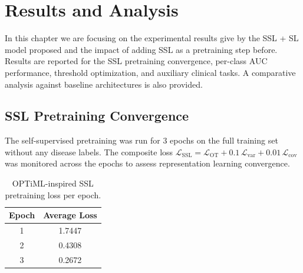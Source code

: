 
\chapter{Results and Analysis}
\label{chap:results}

In this chapter we are focusing on the experimental results give by the SSL + SL model proposed and the impact of adding SSL as a pretraining step before. Results are reported for the SSL pretraining convergence, per-class AUC performance, threshold optimization, and auxiliary clinical tasks. A comparative analysis against baseline architectures is also provided.

\section{SSL Pretraining Convergence}
\label{sec:ssl_results}

The self-supervised pretraining was run for 3 epochs on the full training set without any disease labels. The composite loss $\mathcal{L}_{\text{SSL}} = \mathcal{L}_{\text{OT}} + 0.1\,\mathcal{L}_{\text{var}} + 0.01\,\mathcal{L}_{\text{cov}}$ was monitored across the epochs to assess representation learning convergence.

\begin{table}[ht]
\centering
\caption{OPTiML-inspired SSL pretraining loss per epoch.}
\label{tab:ssl_loss}
\renewcommand{\arraystretch}{1.3}
\begin{tabular}{cc}
\toprule
\textbf{Epoch} & \textbf{Average Loss} \\
\midrule
1  & 1.7447 \\
2  & 0.4308 \\
3  & 0.2672 \\
\bottomrule
\end{tabular}
\end{table}


